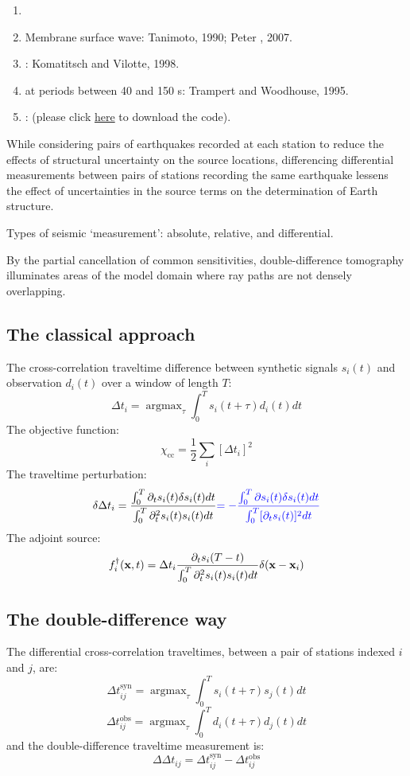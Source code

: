 \begin{enumerate}[\hspace{10mm}*]
  \item \sline
  \item Membrane surface wave: Tanimoto, 1990; Peter \etal, 2007.
  \item {}
    :
    Komatitsch and Vilotte, 1998.
  \item {} at periods between 40 and 150 s:
    Trampert and Woodhouse, 1995.
  \item {}
    :
     (please click \href{https://github.com/yanhuay/seisDD}{here}
    to download the code).
\end{enumerate}

While considering pairs of earthquakes recorded at each station to reduce
the effects of structural uncertainty on the source locations,
differencing differential measurements between pairs of stations recording
the same earthquake lessens the effect of uncertainties in the source terms
on the determination of Earth structure.

Types of seismic `measurement': absolute, relative, and differential.

By the partial cancellation of common sensitivities, double-difference
tomography illuminates areas of the model domain where ray paths are not
densely overlapping.

\subsection{The classical approach}
The cross-correlation traveltime difference between synthetic signals $s_i(t)$
and observation $d_i(t)$ over a window of length $T$:
\[ \Delta t_i = \mathop{\arg\max}_\tau \int_0^T s_i(t + \tau) d_i(t) dt \]
The objective function:
\[ \chi_\text{cc} = \frac{1}{2} \sum_i [\Delta t_i]^2 \]
The traveltime perturbation:
\[ \delta \Delta t_i = \frac{ \int_0^T \partial_t s_i(t) \delta s_i(t) dt }
  { \int_0^T \partial_t^2 s_i(t) s_i(t) dt }
  {\color{blue} = - \frac{ \int_0^T \partial s_i(t) \delta s_i(t) dt }
  { \int_0^T [ \partial_t s_i(t) ]^2 dt } } \]
The adjoint source:
\[ f_i^\dagger(\mathbf{x}, t) = \Delta t_i \frac{ \partial_t s_i(T - t) }
  { \int_0^T \partial_t^2 s_i(t) s_i(t) dt } \delta(\mathbf{x} - \mathbf{x}_i) \]

\subsection{The double-difference way}
The differential cross-correlation traveltimes, between a pair of stations
indexed $i$ and $j$, are:
\[ \Delta t_{ij}^\text{syn} = \mathop{\arg\max}_\tau
  \int_0^T s_i(t + \tau) s_j(t) dt \]
\[ \Delta t_{ij}^\text{obs} = \mathop{\arg\max}_\tau
  \int_0^T d_i(t + \tau) d_j(t) dt \]
and the double-difference traveltime measurement is:
\[ \Delta\Delta t_{ij} = \Delta t_{ij}^\text{syn} - \Delta t_{ij}^\text{obs} \]

